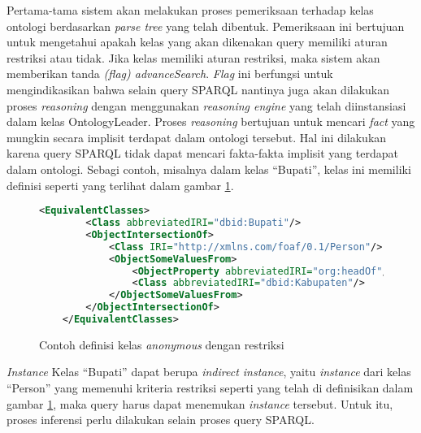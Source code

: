 Pertama-tama sistem akan melakukan proses pemeriksaan terhadap kelas ontologi berdasarkan \emph{parse tree} yang telah dibentuk. Pemeriksaan ini bertujuan untuk mengetahui apakah kelas yang akan dikenakan query memiliki aturan restriksi atau tidak. Jika kelas memiliki aturan restriksi, maka sistem akan memberikan tanda \emph{(flag) advanceSearch}. \emph{Flag} ini berfungsi untuk mengindikasikan bahwa selain query SPARQL nantinya juga akan dilakukan proses \emph{reasoning} dengan menggunakan \emph{reasoning engine} yang telah diinstansiasi dalam kelas OntologyLeader. Proses \emph{reasoning} bertujuan untuk mencari \emph{fact} yang mungkin secara implisit terdapat dalam ontologi tersebut. Hal ini dilakukan karena query SPARQL tidak dapat mencari fakta-fakta implisit yang terdapat dalam ontologi. Sebagi contoh, misalnya dalam kelas ``Bupati'', kelas ini memiliki definisi seperti yang terlihat dalam gambar \ref{fig:definisi_kelas_bupati}.

\begin{figure}[t]
    \centering
    \begin{lstlisting}[language=XML,xleftmargin=0pt]
    <EquivalentClasses>
        <Class abbreviatedIRI="dbid:Bupati"/>
        <ObjectIntersectionOf>
            <Class IRI="http://xmlns.com/foaf/0.1/Person"/>
            <ObjectSomeValuesFrom>
                <ObjectProperty abbreviatedIRI="org:headOf"/>
                <Class abbreviatedIRI="dbid:Kabupaten"/>
            </ObjectSomeValuesFrom>
        </ObjectIntersectionOf>
    </EquivalentClasses>\end{lstlisting}
    \caption{Contoh definisi kelas \emph{anonymous} dengan restriksi}
    \label{fig:definisi_kelas_bupati}
\end{figure}

\emph{Instance} Kelas ``Bupati'' dapat berupa \emph{indirect instance}, yaitu \emph{instance} dari kelas ``Person'' yang memenuhi kriteria restriksi seperti yang telah di definisikan dalam gambar \ref{fig:definisi_kelas_bupati}, maka query harus dapat menemukan \emph{instance} tersebut. Untuk itu, proses inferensi perlu dilakukan selain proses query SPARQL.




